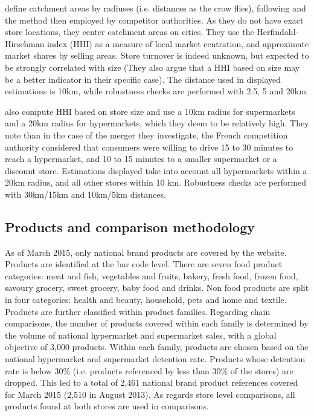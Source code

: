 \documentclass[english]{article}
\begin{document}
\cite{BIS13} define catchment areas by radiuses (i.e. distances as the crow flies), following \cite{BAR06} and the method then employed by competitor authorities. As they do not have exact store locations, they center catchment areas on cities. They use the Herfindahl-Hirschman index (HHI) as a measure of local market centration, and approximate market shares by selling areas. Store turnover is indeed unknown, but expected to be strongly correlated with size (They also argue that a HHI based on size may be a better indicator in their specific case). The distance used in displayed estimations is 10km, while robustness checks are performed with 2.5, 5 and 20km.

\cite{ALL16a} also compute HHI based on store size and use a 10km radius for supermarkets and a 20km radius for hypermarkets, which they deem to be relatively high. They note than in the case of the merger they investigate, the French competition authority considered that consumers were willing to drive 15 to 30 minutes to reach a hypermarket, and 10 to 15 minutes to a smaller supermarket or a discount store. Estimations displayed take into account all hypermarkets within a 20km radius, and all other stores within 10 km. Robustness checks are performed with 30km/15km and 10km/5km distances.

\subsection{Products and comparison methodology}

As of March 2015, only national brand products are covered by the website. Products are identified at the bar code level. There are seven food product categories: meat and fish, vegetables and fruits, bakery, fresh food, frozen food, savoury grocery, sweet grocery, baby food and drinks. Non food products are split in four categories: health and beauty, household, pets and home and textile. Products are further classified within product families. Regarding chain comparisons, the number of products covered within each family is determined by the volume of national hypermarket and supermarket sales, with a global objective of 3,000 products. Within each family, products are chosen based on the national hypermarket and supermarket detention rate. Products whose detention rate is below 30\% (i.e. products referenced by less than 30\% of the stores) are dropped. This led to a total of 2,461 national brand product references covered for March 2015 (2,510 in August 2013). As regards store level comparisons, all products found at both stores are used in comparisons.
\end{document}
